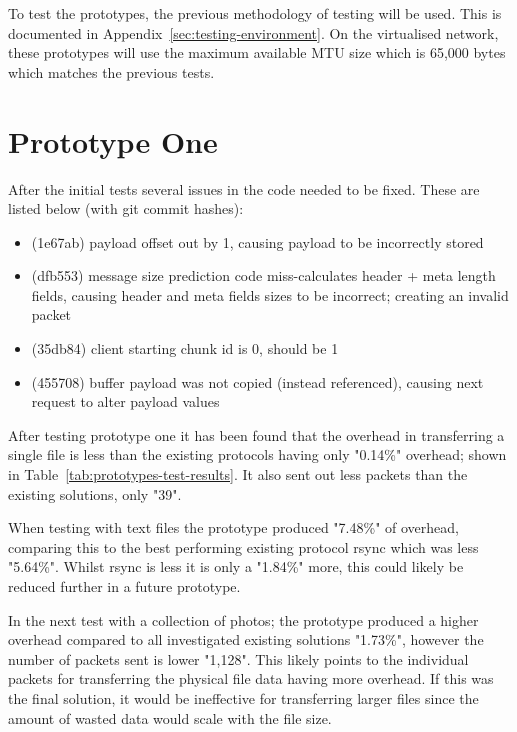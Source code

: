 To test the prototypes, the previous methodology of testing will be used. This is documented in Appendix~\ref{sec:testing-environment}. On the virtualised network, these prototypes will use the maximum available MTU size which is 65,000 bytes which matches the previous tests.

\section{Prototype One}
After the initial tests several issues in the code needed to be fixed. These are listed below (with git commit hashes):

\begin{itemize}
    \item (1e67ab) payload offset out by 1, causing payload to be incorrectly stored
    \item (dfb553) message size prediction code miss-calculates header + meta length fields, causing header and meta fields sizes to be incorrect; creating an invalid packet
    \item (35db84) client starting chunk id is 0, should be 1
    \item (455708) buffer payload was not copied (instead referenced), causing next request to alter payload values
\end{itemize}

After testing prototype one it has been found that the overhead in transferring a single file is less than the existing protocols having only "0.14\%" overhead; shown in Table~\ref{tab:prototypes-test-results}. It also sent out less packets than the existing solutions, only "39".

When testing with text files the prototype produced "7.48\%" of overhead, comparing this to the best performing existing protocol rsync which was less "5.64\%". Whilst rsync is less it is only a
"1.84\%" more, this could likely be reduced further in a future prototype.

In the next test with a collection of photos; the prototype produced a higher overhead compared to all investigated existing solutions "1.73\%", however the number of packets sent is lower "1,128". This likely points to the individual packets for transferring the physical file data having more overhead. If this was the final solution, it would be ineffective for transferring larger files since the amount of wasted data would scale with the file size.


